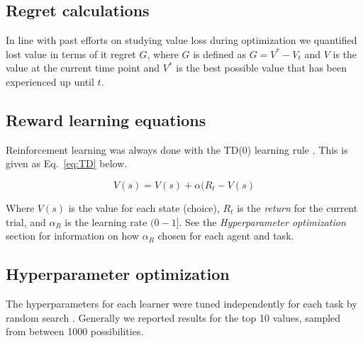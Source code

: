 \subsection*{Regret calculations}
In line with past efforts on studying value loss during optimization we quantified lost value in terms of it regret $G$, where $G$ is defined as $G = V^* - V_t$ and $V$ is the value at the current time point and $V^*$ is the best possible value that has been experienced up until $t$.

\subsection*{Reward learning equations} Reinforcement learning was always done with the TD(0) learning rule \cite{Sutton2018}. This is given as Eq.~\ref{eq:TD} below. 

\begin{equation}
	\label{eq:TD}
	V(s) = V(s) + \alpha (R_t - V(s)
\end{equation}

Where $V(s)$ is the value for each state (choice), $R_t$ is the \emph{return} for the current trial, and $\alpha_R$ is the learning rate $(0-1]$. See the \emph{Hyperparameter optimization} section for information on how $\alpha_R$ chosen for each agent and task.

\subsection*{Hyperparameter optimization}
The hyperparameters for each learner were tuned independently for each task by random search \cite{Bergstra2012}. Generally we reported results for the top 10 values, sampled from between 1000 possibilities. 
